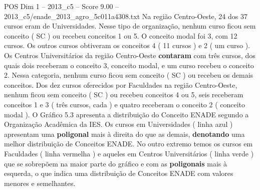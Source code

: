 \begin{textsample}{POS Dim 1 – 2013\_c5 – Score 9.00 – 2013\_c5/enade\_2013\_agro\_5c011a4308.txt}
Na região Centro-Oeste, 24 dos 37 cursos eram de Universidades.
Nesse tipo de organização, nenhum curso ficou sem conceito ( SC ) ou recebeu conceitos 1 ou 5.
O conceito modal foi 3, com 12 cursos.
Os outros cursos obtiveram os conceitos 4 ( 11 cursos ) e 2 ( um curso ).
Os Centros Universitários da região Centro-Oeste \textbf{contaram} com três cursos, dos quais dois receberam o conceito 3, conceito modal, e um curso recebeu o conceito 2.
Nessa categoria, nenhum curso ficou sem conceito ( SC ) ou recebeu os demais conceitos.
Dos dez cursos oferecidos por Faculdades na região Centro-Oeste, nenhum ficou sem conceito ( SC ) ou recebeu conceitos 4 ou 5, seis receberam conceitos 1 e 3 ( três cursos, cada ) e quatro receberam o conceito 2 ( conceito modal ).
O Gráfico 5.3 apresenta a distribuição do Conceito ENADE segundo a Organização Acadêmica da IES.
Os cursos em Universidades ( linha azul ) apresentam uma \textbf{poligonal} mais à direita do que as demais, \textbf{denotando} uma melhor distribuição de Conceitos ENADE.
No outro extremo temos os cursos em Faculdades ( linha vermelha ) e aqueles em Centros Universitários ( linha verde ) que se sobrepõem na maior parte do gráfico e com as \textbf{poligonais} mais à esquerda, o que indica uma distribuição de Conceitos ENADE com valores menores e semelhantes.

\end{textsample}
